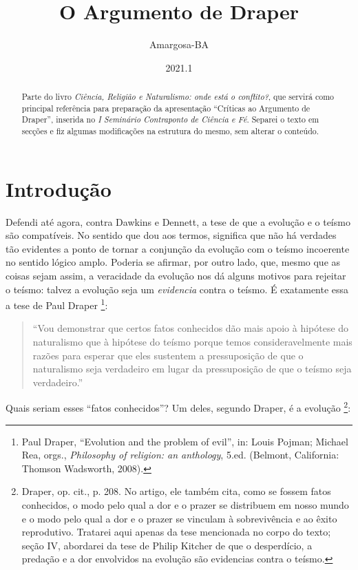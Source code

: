 \documentclass[11pt, a5paper]{exam}
\title{\textbf{O Argumento de Draper}}
\author{Amargosa-BA}
\date{2021.1}
\begin{document}
%
\maketitle
%
%
\begin{abstract}
Parte do livro \textit{Ciência, Religião e Naturalismo: onde está o conflito?},
que servirá como principal referência para preparação da apresentação 
``Críticas ao Argumento de Draper'', inserida no \textit{I Seminário Contraponto
de Ciência e Fé}.
Separei o texto em secções e fiz algumas modificações na estrutura do mesmo, sem
alterar o conteúdo.
\end{abstract}
%

\section{Introdução}

Defendi até agora, contra Dawkins e Dennett, a tese de que a evolução e o teísmo
são compatíveis. 
No sentido que dou aos termos, significa que não há verdades tão evidentes a
ponto de tornar a conjunção da evolução com o teísmo incoerente no sentido 
lógico amplo. 
Poderia se afirmar, por outro lado, que, mesmo que as coisas sejam assim, a 
veracidade da evolução nos dá alguns motivos para rejeitar o teísmo: talvez a 
evolução seja um \textit{evidencia} contra o teísmo.
É exatamente essa a tese de Paul Draper
\footnote
{
  Paul Draper, 
  ``Evolution and the problem of evil'', 
  in: Louis Pojman; Michael Rea, orgs.,
  \textit{Philosophy of religion: an anthology},
  5.ed. (Belmont, California: Thomson Wadsworth, 2008).
}: 

\begin{quote}
  ``Vou demonstrar que certos fatos conhecidos dão mais apoio à hipótese do 
  naturalismo que à hipótese do teísmo porque temos consideravelmente mais 
  razões para esperar que eles sustentem a pressuposição de que o naturalismo 
  seja verdadeiro em lugar da pressuposição de que o teísmo seja verdadeiro.''
\end{quote}

Quais seriam esses ``fatos conhecidos''? 
Um deles, segundo Draper, é a evolução
\footnote
{
  Draper, op. cit., p. 208. No artigo, ele também cita, como se fossem fatos 
  conhecidos, o modo pelo qual a dor e o prazer se distribuem em nosso mundo e o 
  modo pelo qual a dor e o prazer se vinculam à sobrevivência e ao êxito 
  reprodutivo. 
  Tratarei aqui apenas da tese mencionada no corpo do texto; seção IV, abordarei
  da tese de Philip Kitcher de que o desperdício, a predação e a dor envolvidos 
  na evolução são evidencias contra o teísmo.
}: 
\end{document}
